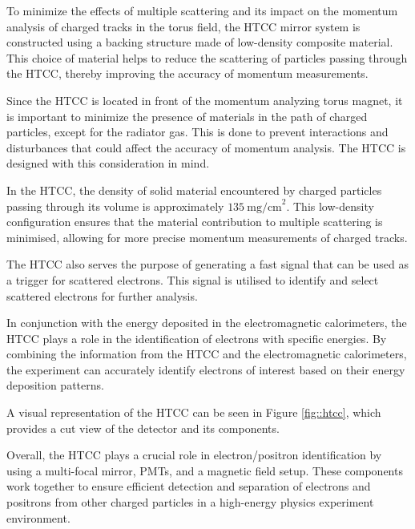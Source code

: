     To minimize the effects of multiple scattering and its impact on the momentum analysis of charged tracks in the torus field, the HTCC mirror system is constructed using a backing structure made of low-density composite material.
    This choice of material helps to reduce the scattering of particles passing through the HTCC, thereby improving the accuracy of momentum measurements.

    Since the HTCC is located in front of the momentum analyzing torus magnet, it is important to minimize the presence of materials in the path of charged particles, except for the radiator gas.
    This is done to prevent interactions and disturbances that could affect the accuracy of momentum analysis.
    The HTCC is designed with this consideration in mind.

    In the HTCC, the density of solid material encountered by charged particles passing through its volume is approximately $135~\text{mg/cm}^2$.
    This low-density configuration ensures that the material contribution to multiple scattering is minimised, allowing for more precise momentum measurements of charged tracks.

    The HTCC also serves the purpose of generating a fast signal that can be used as a trigger for scattered electrons.
    This signal is utilised to identify and select scattered electrons for further analysis.

    In conjunction with the energy deposited in the electromagnetic calorimeters, the HTCC plays a role in the identification of electrons with specific energies.
    By combining the information from the HTCC and the electromagnetic calorimeters, the experiment can accurately identify electrons of interest based on their energy deposition patterns.

    A visual representation of the HTCC can be seen in Figure \ref{fig::htcc}, which provides a cut view of the detector and its components.

    Overall, the HTCC plays a crucial role in electron/positron identification by using a multi-focal mirror, PMTs, and a magnetic field setup.
    These components work together to ensure efficient detection and separation of electrons and positrons from other charged particles in a high-energy physics experiment environment.
